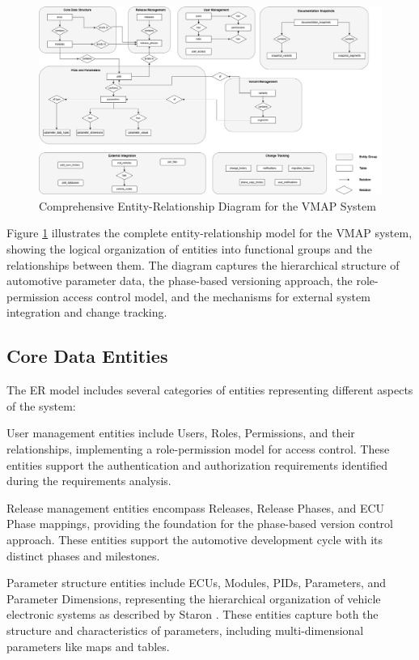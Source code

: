 \begin{figure}[h]
\centering
\includegraphics[width=1.0\textwidth]{figures/vmap_er_diagram.png}
\caption{Comprehensive Entity-Relationship Diagram for the \ac{VMAP} System}
\label{fig}
\end{figure}
Figure \ref{fig} illustrates the complete entity-relationship model for the \ac{VMAP} system, showing the logical organization of entities into functional groups and the relationships between them. The diagram captures the hierarchical structure of automotive parameter data, the phase-based versioning approach, the role-permission access control model, and the mechanisms for external system integration and change tracking.

\subsection{Core Data Entities}
\label{subsec:core-data-entities}

The \ac{ER} model includes several categories of entities representing different aspects of the system:

User management entities include Users, Roles, Permissions, and their relationships, implementing a role-permission model for access control. These entities support the authentication and authorization requirements identified during the requirements analysis.

Release management entities encompass Releases, Release Phases, and \ac{ECU} Phase mappings, providing the foundation for the phase-based version control approach. These entities support the automotive development cycle with its distinct phases and milestones.

Parameter structure entities include \acp{ECU}, Modules, \acp{PID}, Parameters, and Parameter Dimensions, representing the hierarchical organization of vehicle electronic systems as described by Staron \cite{staron2021automotive}. These entities capture both the structure and characteristics of parameters, including multi-dimensional parameters like maps and tables.

